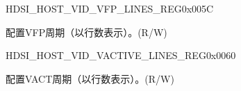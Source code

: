     
    \begin{register}{H}{DSI\_HOST\_VID\_VFP\_LINES\_REG}{0x005C}\label{regdesc:DSIHOSTVIDVFPLINESREG}
    \regnewline%
    \begin{regdesc}\begin{reglist}
    \label{fielddesc:DSIHOSTVFPLINES}\item [DSI\_HOST\_VFP\_LINES] 配置VFP周期（以行数表示）。(R/W)
    \end{reglist}\end{regdesc}
    \end{register}
    
    
    \begin{register}{H}{DSI\_HOST\_VID\_VACTIVE\_LINES\_REG}{0x0060}\label{regdesc:DSIHOSTVIDVACTIVELINESREG}
    \regnewline%
    \begin{regdesc}\begin{reglist}
    \label{fielddesc:DSIHOSTVACTIVELINES}\item [DSI\_HOST\_V\_ACTIVE\_LINES] 配置VACT周期（以行数表示）。(R/W)
    \end{reglist}\end{regdesc}
    \end{register}
    
    
    
